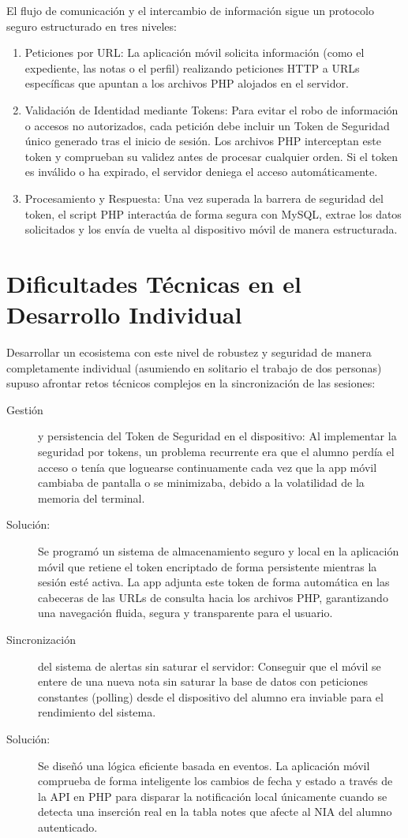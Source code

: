 \documentclass[spanish]{report}
\begin{document}
El flujo de comunicación y el intercambio de información sigue un
protocolo seguro estructurado en tres niveles:
\begin{enumerate}
\item Peticiones por URL: La aplicación móvil solicita información (como
el expediente, las notas o el perfil) realizando peticiones HTTP a
URLs específicas que apuntan a los archivos PHP alojados en el servidor.
\item Validación de Identidad mediante Tokens: Para evitar el robo de información
o accesos no autorizados, cada petición debe incluir un Token de Seguridad
único generado tras el inicio de sesión. Los archivos PHP interceptan
este token y comprueban su validez antes de procesar cualquier orden.
Si el token es inválido o ha expirado, el servidor deniega el acceso
automáticamente.
\item Procesamiento y Respuesta: Una vez superada la barrera de seguridad
del token, el script PHP interactúa de forma segura con MySQL, extrae
los datos solicitados y los envía de vuelta al dispositivo móvil de
manera estructurada.
\end{enumerate}

\section{Dificultades Técnicas en el Desarrollo Individual}

Desarrollar un ecosistema con este nivel de robustez y seguridad de
manera completamente individual (asumiendo en solitario el trabajo
de dos personas) supuso afrontar retos técnicos complejos en la sincronización
de las sesiones:
\begin{description}
\item [{Gestión}] y persistencia del Token de Seguridad en el dispositivo:
Al implementar la seguridad por tokens, un problema recurrente era
que el alumno perdía el acceso o tenía que loguearse continuamente
cada vez que la app móvil cambiaba de pantalla o se minimizaba, debido
a la volatilidad de la memoria del terminal.
\item [{Solución:}] Se programó un sistema de almacenamiento seguro y local
en la aplicación móvil que retiene el token encriptado de forma persistente
mientras la sesión esté activa. La app adjunta este token de forma
automática en las cabeceras de las URLs de consulta hacia los archivos
PHP, garantizando una navegación fluida, segura y transparente para
el usuario.
\item [{Sincronización}] del sistema de alertas sin saturar el servidor:
Conseguir que el móvil se entere de una nueva nota sin saturar la
base de datos con peticiones constantes (polling) desde el dispositivo
del alumno era inviable para el rendimiento del sistema.
\item [{Solución:}] Se diseñó una lógica eficiente basada en eventos. La
aplicación móvil comprueba de forma inteligente los cambios de fecha
y estado a través de la API en PHP para disparar la notificación local
únicamente cuando se detecta una inserción real en la tabla notes
que afecte al NIA del alumno autenticado.
\end{description}
\end{document}

